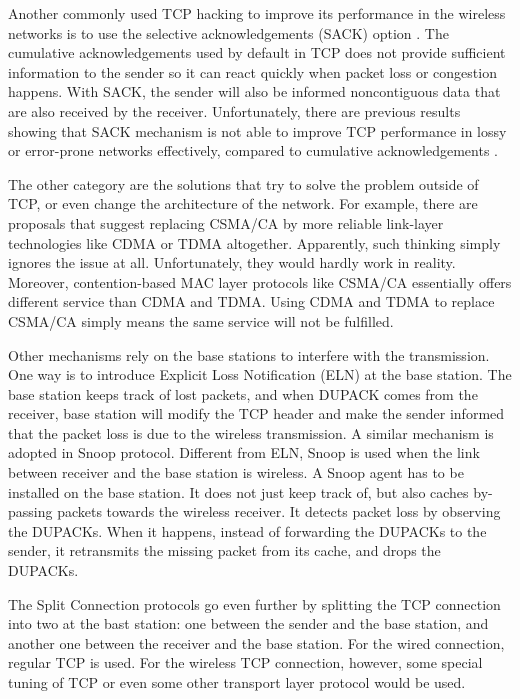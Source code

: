 \documentclass[10pt, conference, final, letterpaper]{IEEEtran}
\theoremstyle{definition}
\begin{document}
Another commonly used TCP hacking to improve its performance in the wireless networks is to use the selective acknowledgements (SACK) option \cite{SACK-RFC}. The cumulative acknowledgements used by default in TCP does not provide sufficient information to the sender so it can react quickly when packet loss or congestion happens. With SACK, the sender will also be informed noncontiguous data that are also received by the receiver. Unfortunately, there are previous results showing that SACK mechanism is not able to improve TCP performance in lossy or error-prone networks effectively, compared to cumulative acknowledgements \cite{TCPWireless}.

The other category are the solutions that try to solve the problem outside of TCP, or even change the architecture of the network. For example, there are proposals that suggest replacing CSMA/CA by more reliable link-layer technologies like CDMA or TDMA altogether. Apparently, such thinking simply ignores the issue at all. Unfortunately, they would hardly work in reality. Moreover, contention-based MAC layer protocols like CSMA/CA essentially offers different service than CDMA and TDMA. Using CDMA and TDMA to replace CSMA/CA simply means the same service will not be fulfilled. 

Other mechanisms rely on the base stations to interfere with the transmission. One way is to introduce Explicit Loss Notification (ELN) at the base station. The base station keeps track of lost packets, and when DUPACK comes from the receiver, base station will modify the TCP header and make the sender informed that the packet loss is due to the wireless transmission. A similar mechanism is adopted in Snoop \cite{Snoop} protocol. Different from ELN, Snoop is used when the link between receiver and the base station is wireless. A Snoop agent has to be installed on the base station. It does not just keep track of, but also caches by-passing packets towards the wireless receiver. It detects packet loss by observing the DUPACKs. When it happens, instead of forwarding the DUPACKs to the sender, it retransmits the missing packet from its cache, and drops the DUPACKs.

The Split Connection protocols \cite{I-TCP} \cite{Split-MTCP} go even further by splitting the TCP connection into two at the bast station: one between the sender and the base station, and another one between the receiver and the base station. For the wired connection, regular TCP is used. For the wireless TCP connection, however, some special tuning of TCP or even some other transport layer protocol would be used.
\end{document}
